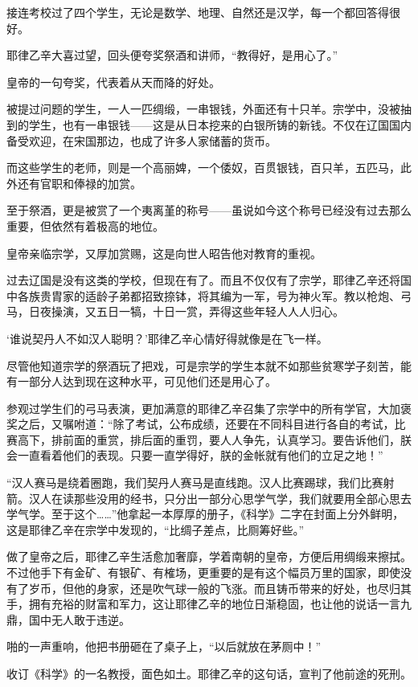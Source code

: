 接连考校过了四个学生，无论是数学、地理、自然还是汉学，每一个都回答得很好。

耶律乙辛大喜过望，回头便夸奖祭酒和讲师，“教得好，是用心了。”

皇帝的一句夸奖，代表着从天而降的好处。

被提过问题的学生，一人一匹绸缎，一串银钱，外面还有十只羊。宗学中，没被抽到的学生，也有一串银钱——这是从日本挖来的白银所铸的新钱。不仅在辽国国内备受欢迎，在宋国那边，也成了许多人家储蓄的货币。

而这些学生的老师，则是一个高丽婢，一个倭奴，百贯银钱，百只羊，五匹马，此外还有官职和俸禄的加赏。

至于祭酒，更是被赏了一个夷离堇的称号——虽说如今这个称号已经没有过去那么重要，但依然有着极高的地位。

皇帝亲临宗学，又厚加赏赐，这是向世人昭告他对教育的重视。

过去辽国是没有这类的学校，但现在有了。而且不仅仅有了宗学，耶律乙辛还将国中各族贵胄家的适龄子弟都招致捺钵，将其编为一军，号为神火军。教以枪炮、弓马，日夜操演，又五日一犒，十日一赏，弄得这些年轻人人人归心。

‘谁说契丹人不如汉人聪明？’耶律乙辛心情好得就像是在飞一样。

尽管他知道宗学的祭酒玩了把戏，可是宗学的学生本就不如那些贫寒学子刻苦，能有一部分人达到现在这种水平，可见他们还是用心了。

参观过学生们的弓马表演，更加满意的耶律乙辛召集了宗学中的所有学官，大加褒奖之后，又嘱咐道：“除了考试，公布成绩，还要在不同科目进行各自的考试，比赛高下，排前面的重赏，排后面的重罚，要人人争先，认真学习。要告诉他们，朕会一直看着他们的表现。只要一直学得好，朕的金帐就有他们的立足之地！”

“汉人赛马是绕着圈跑，我们契丹人赛马是直线跑。汉人比赛踢球，我们比赛射箭。汉人在读那些没用的经书，只分出一部分心思学气学，我们就要用全部心思去学气学。至于这个……”他拿起一本厚厚的册子，《科学》二字在封面上分外鲜明，这是耶律乙辛在宗学中发现的，“比绸子差点，比厕筹好些。”

做了皇帝之后，耶律乙辛生活愈加奢靡，学着南朝的皇帝，方便后用绸缎来擦拭。不过他手下有金矿、有银矿、有榷场，更重要的是有这个幅员万里的国家，即使没有了岁币，但他的身家，还是吹气球一般的飞涨。而且铸币带来的好处，也尽归其手，拥有充裕的财富和军力，这让耶律乙辛的地位日渐稳固，也让他的说话一言九鼎，国中无人敢于违逆。

啪的一声重响，他把书册砸在了桌子上，“以后就放在茅厕中！”

收订《科学》的一名教授，面色如土。耶律乙辛的这句话，宣判了他前途的死刑。

